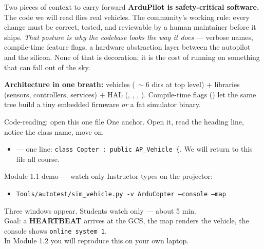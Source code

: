 \documentclass[aspectratio=169,11pt]{beamer}
\begin{document}
\begin{frame}{Two pieces of context to carry forward}
  \textbf{ArduPilot is safety-critical software.} The code we will read flies real vehicles. The community's working rule: every change must be correct, tested, and reviewable by a human maintainer before it ships. \emph{That posture is why the codebase looks the way it does} --- verbose names, compile-time feature flags, a hardware abstraction layer between the autopilot and the silicon. None of that is decoration; it is the cost of running on something that can fall out of the sky.

  \medskip
  \textbf{Architecture in one breath:} vehicles ($\,\sim$6 dirs at top level) + libraries (sensors, controllers, services) + HAL (, , , ). Compile-time flags () let the same tree build a tiny embedded firmware \emph{or} a fat simulator binary.
\end{frame}

\begin{frame}{Code-reading: open this one file}
  One anchor. Open it, read the heading line, notice the class name, move on.
  \begin{itemize}
    \item {} --- one line: \texttt{class Copter : public AP\_Vehicle \{}. We will return to this file all course.
  \end{itemize}
\end{frame}

\begin{frame}{Module 1.1 demo --- watch only}
  Instructor types on the projector:
  \begin{itemize}
    \item[\$] \texttt{Tools/autotest/sim\_vehicle.py -v ArduCopter --console --map}
  \end{itemize}
  Three windows appear. Students watch only --- about 5 min.\\[1ex]
  Goal: a \textbf{HEARTBEAT} arrives at the GCS, the map renders the vehicle, the console shows \texttt{online system 1}.\\[1ex]
  In Module 1.2 you will reproduce this on your own laptop.
\end{frame}
\end{document}

